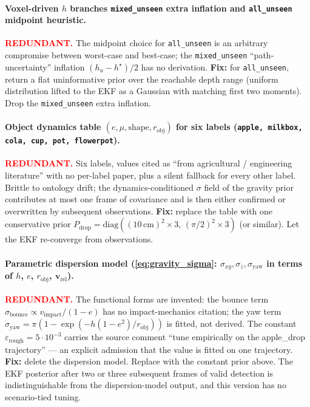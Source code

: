 \documentclass[11pt]{article}
\newcommand{\REDUNDANT}{\textcolor{red}{\textbf{REDUNDANT.}}}
\begin{document}
\paragraph{Voxel-driven $h$ branches \texttt{mixed\_unseen} extra
inflation and \texttt{all\_unseen} midpoint heuristic.}
\REDUNDANT{} The midpoint choice for \texttt{all\_unseen} is an
arbitrary compromise between worst-case and best-case; the
\texttt{mixed\_unseen} ``path-uncertainty'' inflation $(h_u-h^\star)/2$
has no derivation.
\textbf{Fix:} for \texttt{all\_unseen}, return a flat uninformative
prior over the reachable depth range (uniform distribution lifted to
the EKF as a Gaussian with matching first two moments). Drop the
\texttt{mixed\_unseen} extra inflation.

\paragraph{Object dynamics table $(e,\mu,\text{shape},r_{\text{obj}})$
for six labels (\texttt{apple, milkbox, cola, cup, pot, flowerpot}).}
\REDUNDANT{} Six labels, values cited as ``from agricultural /
engineering literature'' with no per-label paper, plus a silent fallback
for every other label. Brittle to ontology drift; the
dynamics-conditioned $\sigma$ field of the gravity prior contributes at
most one frame of covariance and is then either confirmed or overwritten
by subsequent observations.
\textbf{Fix:} replace the table with one conservative prior
$P_{\text{drop}}=\mathrm{diag}((10\,\text{cm})^2{\times}3,\,(\pi/2)^2{\times}3)$
(or similar). Let the EKF re-converge from observations.

\paragraph{Parametric dispersion model
(\eqref{eq:gravity_sigma}: $\sigma_{xy},\sigma_z,\sigma_{\text{yaw}}$
in terms of $h$, $e$, $r_{\text{obj}}$, $\bm v_{\text{rel}}$).}
\REDUNDANT{} The functional forms are invented: the bounce term
$\sigma_{\text{bounce}}\propto v_{\text{impact}}/(1-e)$ has no
impact-mechanics citation; the yaw term
$\sigma_{\text{yaw}}=\pi(1-\exp(-h(1-e^2)/r_{\text{obj}}))$ is fitted,
not derived. The constant $\varepsilon_{\text{rough}}=5\!\cdot\!10^{-3}$
carries the source comment ``tune empirically on the apple\_drop
trajectory'' --- an explicit admission that the value is fitted on one
trajectory.
\textbf{Fix:} delete the dispersion model. Replace with the constant
prior above. The EKF posterior after two or three subsequent frames
of valid detection is indistinguishable from the dispersion-model
output, and this version has no scenario-tied tuning.
\end{document}
